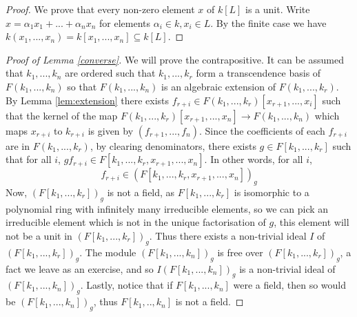 \documentclass[12pt]{article}
\theoremstyle{plain}
\theoremstyle{definition}
\begin{document}
\begin{proof}
We prove that every non-zero element $x$ of $k[L]$ is a unit. Write $x = \alpha_1 x_1 + ... + \alpha_n x_n$ for elements $\alpha_i \in k, x_i \in L$. By the finite case we have $k(x_1,...,x_n) = k[x_1,...,x_n] \subseteq k[L]$.
\end{proof}
\begin{proof}[Proof of Lemma \ref{converse}]
We will prove the contrapositive. It can be assumed that $k_1,...,k_n$ are ordered such that $k_1,...,k_r$ form a transcendence basis of $F(k_1,...,k_n)$ so that $F(k_1,...,k_n)$ is an algebraic extension of $F(k_1,...,k_r)$. By Lemma \ref{lem:extension} there exists $f_{r+i} \in F(k_1,...,k_r)[x_{r+1},...,x_i]$ such that the kernel of the map $F(k_1,...,k_r)[x_{r+1},...,x_n] \to F(k_1,...,k_n)$ which maps $x_{r +i}$ to $k_{r+ i}$ is given by $(f_{r+1},...,f_n)$. Since the coefficients of each $f_{r+i}$ are in $F(k_1,...,k_r)$, by clearing denominators, there exists $g \in F[k_1,...,k_r]$ such that for all $i$, $gf_{r+i} \in F[k_1,...,k_r,x_{r+1},...,x_n]$. In other words, for all $i$, $$f_{r+i} \in (F[k_1,...,k_r,x_{r+1},...,x_n])_g$$
Now, $(F[k_1,...,k_r])_g$ is not a field, as $F[k_1,...,k_r]$ is isomorphic to a polynomial ring with infinitely many irreducible elements, so we can pick an irreducible element which is not in the unique factorisation of $g$, this element will not be a unit in $(F[k_1,...,k_r])_g$. Thus there exists a non-trivial ideal $I$ of $(F[k_1,...,k_r])_g$. The module $(F[k_1,...,k_n])_g$ is free over $(F[k_1,...,k_r])_g$, a fact we leave as an exercise, and so $I(F[k_1,...,k_n])_g$ is a non-trivial ideal of $(F[k_1,...,k_n])_g$. Lastly, notice that if $F[k_1,...,k_n]$ were a field, then so would be $(F[k_1,...,k_n])_g$, thus $F[k_1,..,k_n]$ is not a field.
\end{proof}
\end{document}
